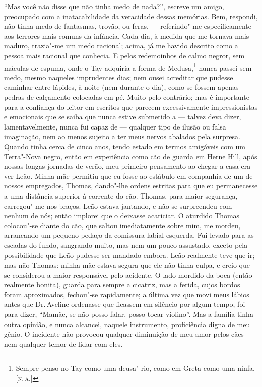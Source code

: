 ``Mas você não disse que não tinha medo de nada?'', escreve um
amigo, preocupado com a inatacabilidade da veracidade dessas memórias.
Bem, respondi, não tinha medo de fantasmas, trovão, ou feras, ---
referindo"-me especificamente aos terrores mais comuns da infância. Cada
dia, à medida que me tornava mais maduro, trazia"-me um medo racional;
acima, já me havido descrito como a pessoa mais racional que conhecia. E
pelos redemoinhos de calmo negror, sem máculas de espuma, onde o Tay
adquiria a forma de Medusa,\footnote{Sempre penso no Tay como uma
  deusa"-rio, como em Greta como uma ninfa. {[}\textsc{n.\,a.}{]}} nunca passei
sem medo, mesmo naqueles imprudentes dias; nem ousei acreditar que
pudesse caminhar entre lápides, à noite (nem durante o dia), como se
fossem apenas pedras de calçamento colocadas em pé. Muito pelo
contrário; mas é importante para a confiança do leitor em escritos que
parecem excessivamente impressionistas e emocionais que se saiba que
nunca estive submetido a --- talvez deva dizer, lamentavelmente, nunca
fui capaz de --- qualquer tipo de ilusão ou falsa imaginação, nem ao
menos sujeito a ter meus nervos abalados pela surpresa. Quando tinha
cerca de cinco anos, tendo estado em termos amigáveis com um Terra"-Nova
negro, então em experiência como cão de guarda em Herne Hill, após
nossas longas jornadas de verão, meu primeiro pensamento ao chegar a
casa era ver Leão. Minha mãe permitiu que eu fosse ao estábulo em
companhia de um de nossos empregados, Thomas, dando"-lhe ordens estritas
para que eu permanecesse a uma distância superior à corrente do cão.
Thomas, para maior segurança, carregou"-me nos braços. Leão estava
jantando, e não se surpreendeu com nenhum de nós; então implorei que o
deixasse acariciar. O aturdido Thomas colocou"-se diante do cão, que
saltou imediatamente sobre mim, me mordeu, arrancando um pequeno pedaço
da comissura labial esquerda. Fui levado para as escadas do fundo,
sangrando muito, mas nem um pouco assustado, exceto pela possibilidade
que Leão pudesse ser mandado embora. Leão realmente teve que ir; mas não
Thomas: minha mãe estava segura que ele não tinha culpa, e creio que se
considerou a maior responsável pelo acidente. O lado mordido da boca
(então realmente bonita), guarda para sempre a cicatriz, mas a ferida,
cujos bordos foram aproximados, fechou"-se rapidamente; a última vez que
movi meus lábios antes que Dr.\,Aveline ordenasse que ficassem em
silêncio por algum tempo, foi para dizer, ``Mamãe, se não posso falar,
posso tocar violino''. Mas a família tinha outra opinião, e nunca
alcancei, naquele instrumento, proficiência digna de meu gênio. O
incidente não provocou qualquer diminuição de meu amor pelos cães nem
qualquer temor de lidar com eles.

